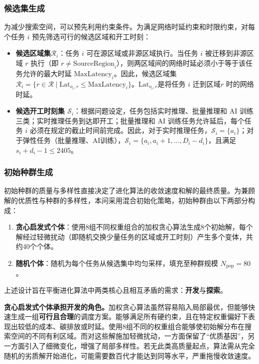 \documentclass[UTF8,a4paper,zihao=-4]{ctexart}
\begin{document}
\subsubsection{候选集生成}

为减少搜索空间，可以预先利用约束条件。为满足网络时延约束和时限约束，对每个任务 $i$ 预先筛选可行的候选区域和开工时刻：
\begin{itemize}
    \item \textbf{候选区域集$\mathcal{R}_i$}：任务 \(i\) 可在源区域或非源区域执行。当任务 \(i\) 被迁移到非源区域 \(r\) 执行（即 \(r \neq \mathrm{SourceRegion}_i\)），则两区域间的网络时延必须小于等于该任务允许的最大时延 \(\mathrm{MaxLatency}_i\)。因此，候选区域集 $\mathcal{R}_i = \{ r \in \mathcal{R} \mid \text{Lat}_{o_i,r} \leq \text{MaxLatency}_i \}$。$\text{Lat}_{o_i,r} $是将任务 \(i\) 迁到区域\(r\) 时的网络时延。
    \item \textbf{候选开工时刻集 $\mathcal{S}_i$}：根据问题设定，任务包括实时推理、批量推理和 AI 训练三类；实时推理任务到达即开工；批量推理和 AI 训练任务允许延后，每个任务 \(i\) 必须在规定的截止时间前完成。因此，对于实时推理任务，$\mathcal{S}_i = \{a_i\}$；对于弹性任务（批量推理、AI训练），$\mathcal{S}_i = \{a_i, a_i+1, \dots, D_i - d_i\}$，且满足 $s_i + d_i - 1 \leq 2405$。
\end{itemize}

\subsubsection{初始种群生成}

初始种群的质量与多样性直接决定了进化算法的收敛速度和解的最终质量。为兼顾解的优质性与种群的多样性，本问采用混合初始化策略，初始种群由以下两部分构成：

\begin{enumerate}
    \item \textbf{贪心启发式个体}：使用8组不同权重组合的加权贪心算法生成8个初始解，每个解经过轻微扰动（即随机交换少量任务的区域或开工时刻）产生多个变体，共约40个个体。
    \item \textbf{随机个体}：随机为每个任务从候选集中均匀采样，填充至种群规模 $N_{\text{pop}} = 80$。
\end{enumerate}

上述设计旨在平衡进化算法中两类核心且相互矛盾的需求：\textbf{开发}与\textbf{探索}。

\textbf{贪心启发式个体承担开发的角色。}加权贪心算法虽然容易陷入局部最优，但能够快速生成一组\textbf{可行且合理}的调度方案。能够满足所有硬约束，且在特定权重偏好下表现出较低的成本、碳排放或时延。使用8组不同的权重组合能够使初始解分布在搜索空间的不同有利区域。而对这些解施加轻微扰动，一方面保留了“优质基因”，另一方面引入了细微变化，增强了局部多样性。若无此类高质量起点，算法需从完全随机的劣质解开始进化，可能需要数百代才能达到同等水平，严重拖慢收敛速度。
\end{document}
